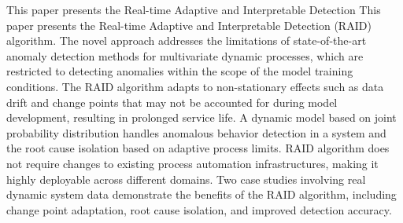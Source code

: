 This paper presents the Real-time Adaptive and Interpretable Detection 
This paper presents the Real-time Adaptive and Interpretable Detection (RAID) algorithm. The novel approach addresses the limitations of state-of-the-art anomaly detection methods for multivariate dynamic processes, which are restricted to detecting anomalies within the scope of the model training conditions. The RAID algorithm adapts to non-stationary effects such as data drift and change points that may not be accounted for during model development, resulting in prolonged service life. A dynamic model based on joint probability distribution handles anomalous behavior detection in a system and the root cause isolation based on adaptive process limits. RAID algorithm does not require changes to existing process automation infrastructures, making it highly deployable across different domains. Two case studies involving real dynamic system data demonstrate the benefits of the RAID algorithm, including change point adaptation, root cause isolation, and improved detection accuracy.
